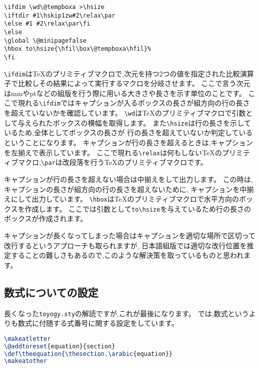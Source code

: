 \begin{verbatim}
\ifdim \wd\@tempboxa >\hsize
\iftdir #1\hskip1zw#2\relax\par
\else #1 #2\relax\par\fi
\else
\global \@minipagefalse
\hbox to\hsize{\hfil\box\@tempboxa\hfil}%
\fi
\end{verbatim}
\verb|\ifdim|は{\TeX}のプリミティブマクロで,次元を持つ2つの値を指定された比較演算子で比較しその結果によって実行するマクロを分岐させます。
ここで言う次元はmmやptなどの組版を行う際に用いる大きさや長さを示す単位のことです。
ここで現れる\verb|\ifdim|ではキャプションが入るボックスの長さが組方向の行の長さを超えていないかを確認しています。
\verb|\wd|は{\TeX}のプリミティブマクロで引数として与えられたボックスの横幅を取得します。
また\verb|\hsize|は行の長さを示しているため,全体としてボックスの長さが
行の長さを超えていないか判定しているということになります。
キャプションが行の長さを超えるときは,キャプションを左揃えで表示しています。
ここで現れる\verb|\relax|は何もしない{\TeX}のプリミティブマクロ,\verb|\par|は改段落を行う{\TeX}のプリミティブマクロです。

キャプションが行の長さを超えない場合は中揃えをして出力します。
この時は,キャプションの長さが組方向の行の長さを超えないために,
キャプションを中揃えにして出力しています。
\verb|\hbox|は{\TeX}のプリミティブマクロで水平方向のボックスを作成します。
ここでは引数として\verb|to\hsize|を与えているため行の長さのボックスが作成されます。

キャプションが長くなってしまった場合はキャプションを適切な場所で区切って改行するというアプローチも取られますが,
日本語組版では適切な改行位置を推定することの難しさもあるので,このような解決策を取っているものと思われます。

\subsection{数式についての設定}

長くなった\verb|toyogy.sty|の解読ですが,これが最後になります。
では,数式というよりも数式に付随する式番号に関する設定をしています。
\begin{lstlisting}[caption = 数式についての設定, label = list:eq, language = tex]
\makeatletter
\@addtoreset{equation}{section}
\def\theequation{\thesection.\arabic{equation}}
\makeatother
\end{lstlisting}

